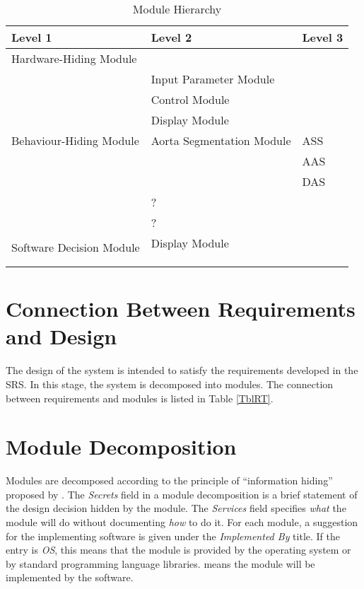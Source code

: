 \documentclass[12pt, titlepage]{article}
\begin{document}
\begin{table}[h!]
\centering
\begin{tabular}{p{} p{}p{}}
\toprule
\textbf{Level 1} & \textbf{Level 2} & \textbf{Level 3}\\
\midrule

{Hardware-Hiding Module} & ~ \\
\midrule

\multirow{7}{0.3\textwidth}{Behaviour-Hiding Module} &  Input Parameter Module & \\
& Control Module  & \\
& Display Module  & \\
& Aorta Segmentation Module & ASS\\
&  &  AAS\\
&  &  DAS\\
& ? & \\
& ? & \\
\midrule

\multirow{3}{0.3\textwidth}{Software Decision Module} & Display Module \\
& \\ 
& \\
& \\
\bottomrule

\end{tabular}
\caption{Module Hierarchy}
\label{TblMH}
\end{table}

\section{Connection Between Requirements and Design} \label{SecConnection}

The design of the system is intended to satisfy the requirements developed in
the SRS. In this stage, the system is decomposed into modules. The connection
between requirements and modules is listed in Table \ref{TblRT}.

\section{Module Decomposition} \label{SecMD}

Modules are decomposed according to the principle of ``information hiding''
proposed by \citet{ParnasEtAl1984}. The \emph{Secrets} field in a module
decomposition is a brief statement of the design decision hidden by the
module. The \emph{Services} field specifies \emph{what} the module will do
without documenting \emph{how} to do it. For each module, a suggestion for the
implementing software is given under the \emph{Implemented By} title. If the
entry is \emph{OS}, this means that the module is provided by the operating
system or by standard programming language libraries.  \emph{\progname{}} means the
module will be implemented by the \progname{} software.
\end{document}
